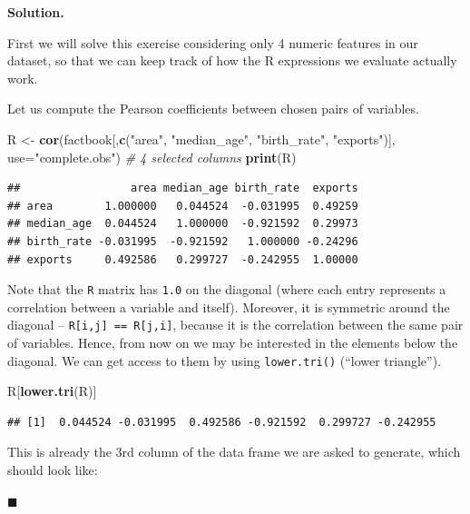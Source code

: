 \documentclass[10pt,b5paper,krantz1]{krantz}
\newenvironment{Shaded}{\begin{snugshade}}{\end{snugshade}}
\newcommand{\CommentTok}[1]{\textcolor[rgb]{0.37,0.37,0.37}{\textit{#1}}}
\newcommand{\DataTypeTok}[1]{\textcolor[rgb]{0.27,0.27,0.27}{#1}}
\newcommand{\KeywordTok}[1]{\textcolor[rgb]{0.27,0.27,0.27}{\textbf{#1}}}
\newcommand{\NormalTok}[1]{#1}
\newcommand{\StringTok}[1]{\textcolor[rgb]{0.5,0.5,0.5}{#1}}
\newenvironment{solution}{%
\bigskip\noindent\textbf{Solution. }%
\it\ignorespaces%
\ignorespaces%
}{\ignorespaces%
\hfill$\blacksquare$%
}
\begin{document}
\begin{solution}

First we will solve this exercise considering only
4 numeric features in our dataset, so that we can keep
track of how the R expressions we evaluate actually work.

Let us compute the Pearson coefficients between chosen pairs of variables.

\begin{Shaded}
\begin{Highlighting}[]
\NormalTok{R <-}\StringTok{ }\KeywordTok{cor}\NormalTok{(factbook[,}\KeywordTok{c}\NormalTok{(}\StringTok{"area"}\NormalTok{, }\StringTok{"median_age"}\NormalTok{, }\StringTok{"birth_rate"}\NormalTok{, }\StringTok{"exports"}\NormalTok{)],}
    \DataTypeTok{use=}\StringTok{"complete.obs"}\NormalTok{) }\CommentTok{# 4 selected columns}
\KeywordTok{print}\NormalTok{(R)}
\end{Highlighting}
\end{Shaded}

\begin{verbatim}
##                 area median_age birth_rate  exports
## area        1.000000   0.044524  -0.031995  0.49259
## median_age  0.044524   1.000000  -0.921592  0.29973
## birth_rate -0.031995  -0.921592   1.000000 -0.24296
## exports     0.492586   0.299727  -0.242955  1.00000
\end{verbatim}

Note that the \texttt{R} matrix has \texttt{1.0} on the diagonal (where each entry
represents a correlation between a variable and itself).
Moreover, it is symmetric around the diagonal -- \texttt{R{[}i,j{]}\ ==\ R{[}j,i{]}},
because it is the correlation between the same pair of variables.
Hence, from now on we may be interested in the elements
below the diagonal. We can get access to them by using \texttt{lower.tri()}
(``lower triangle'').

\begin{Shaded}
\begin{Highlighting}[]
\NormalTok{R[}\KeywordTok{lower.tri}\NormalTok{(R)]}
\end{Highlighting}
\end{Shaded}

\begin{verbatim}
## [1]  0.044524 -0.031995  0.492586 -0.921592  0.299727 -0.242955
\end{verbatim}

This is already the 3rd column of the data frame we are asked to generate,
which should look like:


\end{solution}
\end{document}
